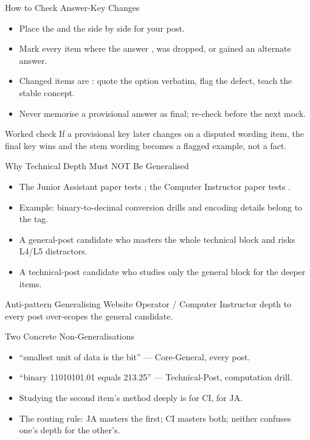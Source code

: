 \documentclass[aspectratio=169]{beamer}
\begin{document}
\begin{frame}{How to Check Answer-Key Changes}
  \begin{itemize}
    \item Place the  and the  side by side for your post.
    \item Mark every item where the answer , was dropped, or gained an alternate answer.
    \item Changed items are : quote the option verbatim, flag the defect, teach the stable concept.
    \item Never memorise a provisional answer as final; re-check before the next mock.
  \end{itemize}
  \begin{exampleblock}{Worked check}
    If a provisional key later changes on a disputed wording item, the final key wins and the stem wording becomes a flagged example, not a fact.
  \end{exampleblock}
\end{frame}

\begin{frame}{Why Technical Depth Must NOT Be Generalised}
  \begin{itemize}
    \item The Junior Assistant paper tests ; the Computer Instructor paper tests .
    \item Example: binary-to-decimal conversion drills and encoding details belong to the  tag.
    \item A general-post candidate who masters the whole technical block  and risks L4/L5 distractors.
    \item A technical-post candidate who studies only the general block  for the deeper items.
  \end{itemize}
  \begin{alertblock}{Anti-pattern}
    Generalising Website Operator / Computer Instructor depth to every post over-scopes the general candidate.
  \end{alertblock}
\end{frame}

\begin{frame}{Two Concrete Non-Generalisations}
  \begin{itemize}
    \item {} ``smallest unit of data is the bit'' --- Core-General, every post.
    \item {} ``binary 11010101.01 equals 213.25'' --- Technical-Post, computation drill.
    \item Studying the second item's method deeply is  for CI,  for JA.
    \item The routing rule: JA masters the first; CI masters both; neither confuses one's depth for the other's.
  \end{itemize}
\end{frame}
\end{document}
